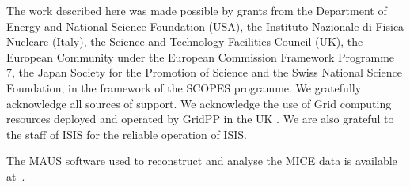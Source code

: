 \acknowledgments

The work described here was made possible by grants from the Department of Energy and National Science Foundation (USA), the Instituto Nazionale di Fisica Nucleare (Italy), 
the Science and Technology Facilities Council (UK), the European Community under the European Commission Framework Programme 7, the Japan Society for the Promotion of 
Science and the Swiss National Science Foundation, in the framework of the SCOPES programme. We gratefully acknowledge all sources of support.
We acknowledge the use of Grid computing resources deployed and operated by GridPP in the UK \cite{grid_pp_2009}. We are also grateful to the staff of ISIS for the reliable operation of ISIS.

The MAUS software used to reconstruct and analyse the MICE data is available at~\cite{MICE_code}.

